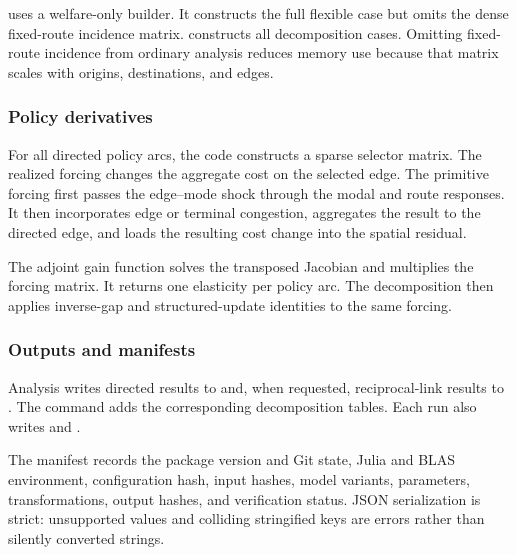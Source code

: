  uses a welfare-only builder. It constructs the full flexible
case but omits the dense fixed-route incidence matrix. 
constructs all decomposition cases. Omitting fixed-route incidence from ordinary analysis
reduces memory use because that matrix scales with origins, destinations, and
edges.

\subsubsection{Policy derivatives}

For all directed policy arcs, the code constructs a sparse selector matrix.
The realized forcing changes the aggregate cost on the selected edge. The
primitive forcing first passes the edge--mode shock through the modal and route
responses. It then incorporates edge or terminal congestion, aggregates the
result to the directed edge, and loads the resulting cost change into the
spatial residual.

The adjoint gain function solves the transposed Jacobian and multiplies the
forcing matrix. It returns one elasticity per policy arc. The decomposition
then applies inverse-gap and structured-update identities to the same forcing.

\subsubsection{Outputs and manifests}

Analysis writes directed results to  and, when
requested, reciprocal-link results to . The
 command adds the corresponding decomposition tables. Each run
also writes  and .

The manifest records the package version and Git state, Julia and BLAS
environment, configuration hash, input hashes, model variants, parameters,
transformations, output hashes, and verification status. JSON serialization is
strict: unsupported values and colliding stringified keys are errors rather
than silently converted strings.

